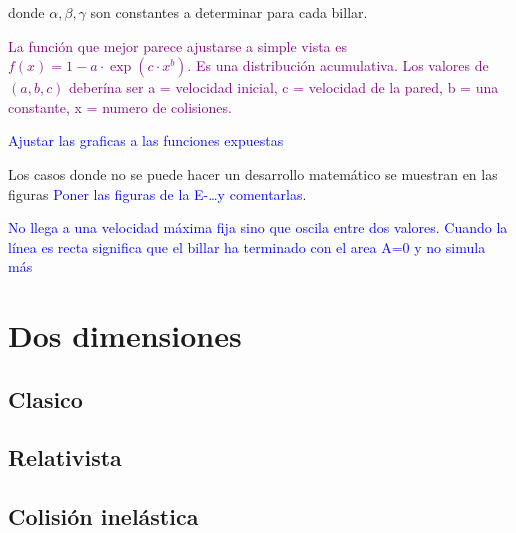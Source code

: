 \documentclass[11pt, spanish]{book}
\begin{document}
donde \( \alpha, \beta, \gamma \) son constantes a determinar para cada billar. 

\textcolor{purple}{La función que mejor parece ajustarse a simple vista es \( f(x)=1 - a\cdot\exp(c\cdot x^b) \). Es una distribución acumulativa. Los valores de \( (a, b, c) \) deberína ser a = velocidad inicial, c = velocidad de la pared, b = una constante, x = numero de colisiones.} 

\textcolor{blue}{Ajustar las graficas a las funciones expuestas}


Los casos donde no se puede hacer un desarrollo matemático se muestran en las figuras \textcolor{blue}{Poner las figuras de la E-\ldots y comentarlas}.

\textcolor{blue}{No llega a una velocidad máxima fija sino que oscila entre dos valores. Cuando la línea es recta significa que el billar ha terminado con el area A=0 y no simula más}

\section{Dos dimensiones}

\subsection{Clasico}

\subsection{Relativista}

\subsection{Colisión inelástica}
\end{document}
